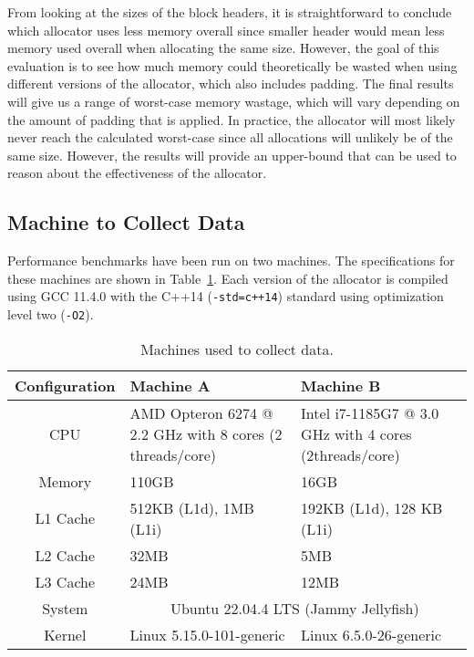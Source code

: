 From looking at the sizes of the block headers, it is straightforward to conclude which allocator uses less memory overall since smaller header would mean less memory used overall when allocating the same size. However, the goal of this evaluation is to see how much memory could theoretically be wasted when using different versions of the allocator, which also includes padding. The final results will give us a range of worst-case memory wastage, which will vary depending on the amount of padding that is applied. In practice, the allocator will most likely never reach the calculated worst-case since all allocations will unlikely be of the same size. However, the results will provide an upper-bound that can be used to reason about the effectiveness of the allocator.

\subsection{Machine to Collect Data}

Performance benchmarks have been run on two machines. The specifications for these machines are shown in Table~\ref{table:machines}. Each version of the allocator is compiled using GCC 11.4.0 with the C++14 (\texttt{-std=c++14}) standard using optimization level two (\texttt{-O2}).

\begin{table}[H]
\begin{tabular}{cp{5.54cm}p{5.54cm}}
Configuration & Machine A                                                & Machine B                                              \\ \hline
CPU           & AMD Opteron 6274 @ 2.2 GHz with 8 cores (2 threads/core) & Intel i7-1185G7 @ 3.0 GHz with 4 cores (2threads/core) \\ \hline
Memory        & 110GB                                                    & 16GB                                                   \\ \hline
L1 Cache      & 512KB (L1d), 1MB (L1i)                                   & 192KB (L1d), 128 KB (L1i)                              \\ \hline
L2 Cache      & 32MB                                                     & 5MB                                                    \\ \hline
L3 Cache      & 24MB                                                     & 12MB                                                   \\ \hline
System        & \multicolumn{2}{c}{Ubuntu 22.04.4 LTS (Jammy Jellyfish)}                                                          \\ \hline
Kernel        & Linux 5.15.0-101-generic                                 & Linux 6.5.0-26-generic                                
\end{tabular}
\caption{Machines used to collect data.}
\label{table:machines}
\end{table}

